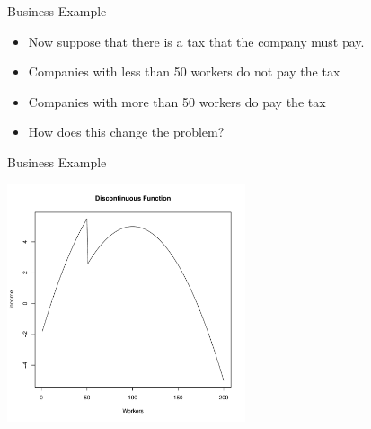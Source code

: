 \documentclass[10pt]{beamer}
\begin{document}
\begin{frame}{Business Example}
  \begin{itemize}
  \item Now suppose that there is a tax that the company must pay.

  \item Companies with less than 50 workers do not pay the tax

  \item Companies with more than 50 workers do pay the tax

  \item How does this change the problem?
  \end{itemize}
\end{frame}
\begin{frame}{Business Example}
  \begin{center}
    \includegraphics[height=7cm]{RCode/discontfunc.pdf}
  \end{center}
\end{frame}
\end{document}
